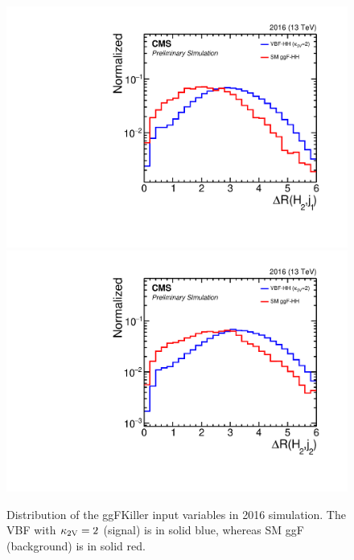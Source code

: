 \begin{figure}[htbp!]
\begin{center}
\includegraphics[width=0.27\linewidth]{Figures/AnalysisStrategy/eventselection/ggfkiller/2016ggfkiller/plot_2016_h_h2j1_deltaR.pdf}
\includegraphics[width=0.27\linewidth]{Figures/AnalysisStrategy/eventselection/ggfkiller/2016ggfkiller/plot_2016_h_h2j2_deltaR.pdf}
\end{center}
\caption[Distribution of the ggFKiller input  variables in 2016 simulation]{Distribution of the ggFKiller input  variables in 2016 simulation. The VBF with $\mathrm{\kappa_{2V} }=2$ (signal) is in solid blue, whereas SM ggF (background) is in solid red.}
\label{event_selection:fig:bdtvariables2016}
\end{figure}

\clearpage

